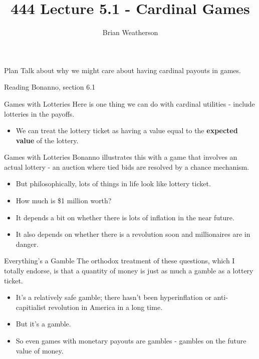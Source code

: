 \documentclass[
  ignorenonframetext,
]{beamer}
\title{444 Lecture 5.1 - Cardinal Games}
\author{Brian Weatherson}
\date{}
\providecommand{\tightlist}{%
  \setlength{\itemsep}{0pt}\setlength{\parskip}{0pt}}
\begin{document}
\frame{\titlepage}

\begin{frame}{Plan}
\protect\hypertarget{plan}{}
Talk about why we might care about having cardinal payouts in games.
\end{frame}

\begin{frame}{Reading}
\protect\hypertarget{reading}{}
Bonanno, section 6.1
\end{frame}

\begin{frame}{Games with Lotteries}
\protect\hypertarget{games-with-lotteries}{}
Here is one thing we can do with cardinal utilities - include lotteries
in the payoffs.

\begin{itemize}
\tightlist
\item
  We can treat the lottery ticket as having a value equal to the
  \textbf{expected value} of the lottery.
\end{itemize}
\end{frame}

\begin{frame}{Games with Lotteries}
\protect\hypertarget{games-with-lotteries-1}{}
Bonanno illustrates this with a game that involves an actual lottery -
an auction where tied bids are resolved by a chance mechanism.

\begin{itemize}
\tightlist
\item
  But philosophically, lots of things in life look like lottery ticket.
\item
  How much is \$1 million worth? \pause
\item
  It depends a bit on whether there is lots of inflation in the near
  future. \pause
\item
  It also depends on whether there is a revolution soon and millionaires
  are in danger.
\end{itemize}
\end{frame}

\begin{frame}{Everything's a Gamble}
\protect\hypertarget{everythings-a-gamble}{}
The orthodox treatment of these questions, which I totally endorse, is
that a quantity of money is just as much a gamble as a lottery ticket.

\begin{itemize}
\tightlist
\item
  It's a relatively safe gamble; there hasn't been hyperinflation or
  anti-capitialist revolution in America in a long time.
\item
  But it's a gamble.
\item
  So even games with monetary payouts are gambles - gambles on the
  future value of money.
\end{itemize}
\end{frame}
\end{document}
